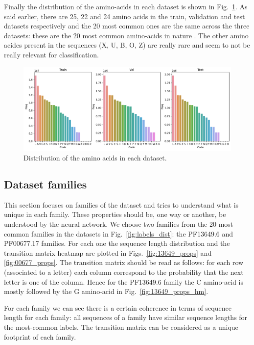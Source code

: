 \documentclass[12pt]{article}
\begin{document}
Finally the distribution of the amino-acids in each dataset is shown in Fig.~\ref{fig:aminoacids_dist}. As said earlier, there are 25, 22 and 24 amino acids in the train, validation and test datasets respectively and the 20 most common ones are the same across the three datasets: these are the 20 most common amino-acids in nature \citep{twenty_aminoacids}. The other amino acides present in the sequences (X, U, B, O, Z) are really rare and seem to not be really relevant for classification.

\begin{figure}[htbp]
    \centering
    \includegraphics[width=\textwidth]{figures/amino_acids_dist.pdf}
    \caption{Distribution of the amino acids in each dataset.}
    \label{fig:aminoacids_dist}
\end{figure}

\subsection{Dataset families}

This section focuses on families of the dataset and tries to understand what is unique in each family. These properties should be, one way or another, be understood by the neural network. We choose two families from the 20 most common families in the datasets in Fig.~\ref{fig:labels_dist}: the PF13649.6 and PF00677.17 families. For each one the sequence length distribution and the transition matrix heatmap are plotted in Figs.~\ref{fig:13649_props} and \ref{fig:00677_props}. The transition matrix should be read as follows: for each row (associated to a letter) each column correspond to the probability that the next letter is one of the column. Hence for the PF13649.6 family the C amino-acid is mostly followed by the G amino-acid in Fig.~\ref{fig:13649_props_hm}.

For each family we can see there is a certain coherence in terms of sequence length for each family: all sequences of a family have similar sequence lengths for the most-common labels. The transition matrix can be considered as a unique footprint of each family.
\end{document}
